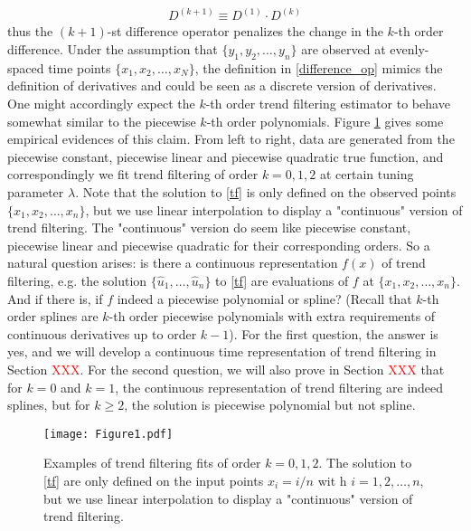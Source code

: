 \documentclass[a4paper]{article}
\begin{document}
\begin{align}
D^{(k+1)} \equiv D^{(1)} \cdot D^{(k)} \label{difference_op}
\end{align}
thus the $(k+1)$-st difference operator penalizes the change in the $k$-th order difference. Under the assumption that $\{y_1,y_2,\ldots, y_n\}$ are observed at evenly-spaced time points $\{x_1,x_2,\ldots, x_N\}$, the definition in \eqref{difference_op} mimics the definition of derivatives and could be seen as a discrete version of derivatives. One might accordingly expect the $k$-th order trend filtering estimator to behave somewhat similar to the piecewise $k$-th order polynomials. Figure \ref{fig:Figure1_examples} gives some empirical evidences of this claim. From left to right, data are generated from the piecewise constant, piecewise linear and piecewise quadratic true function, and correspondingly we fit trend filtering of order $k = 0,1,2$ at certain tuning parameter $\lambda$. Note that the solution to \eqref{tf} is only defined on the observed points $\{x_1,x_2, \ldots, x_n\}$, but we use linear interpolation to display a "continuous" version of trend filtering. The "continuous" version do seem like piecewise constant, piecewise linear and piecewise quadratic for their corresponding orders. So a natural question arises: is there a continuous representation $f(x)$ of trend filtering, e.g. the solution $\{\hat{u}_1,\ldots, \hat{u}_n\}$ to \eqref{tf} are evaluations of $f$ at $\{x_1, x_2,\ldots, x_n\}$. And if there is, if $f$ indeed a piecewise polynomial or spline? (Recall that $k$-th order splines are $k$-th order piecewise polynomials with extra requirements of continuous derivatives up to order $k-1$). For the first question, the answer is yes, and we will develop a continuous time representation of trend filtering in Section \textcolor{red}{XXX}. For the second question, we will also prove in Section \textcolor{red}{XXX} that for $k=0$ and $k=1$, the continuous representation of trend filtering are indeed splines, but for $k\geq 2$, the solution is piecewise polynomial but not spline. 

\begin{figure}[t!]
\centering
\texttt{[image: Figure1.pdf]}
\caption{Examples of trend filtering fits of order $k =0, 1, 2$. The solution to \eqref{tf} are only defined on the input points $x_i = i/n$ wit h $i=1,2,\ldots, n$, but we use linear interpolation to display a "continuous" version of trend filtering.}
\label{fig:Figure1_examples}
\end{figure}
\end{document}

